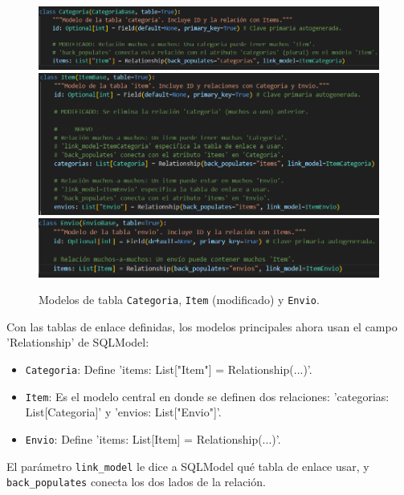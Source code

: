 \documentclass[12pt]{article}
\begin{document}
\begin{figure}[H]
    \centering
    \includegraphics[width=1\textwidth]{Imagenes/Prac4_2.1.png}
    \includegraphics[width=1\textwidth]{Imagenes/Prac4_2.2.png}
    \includegraphics[width=1\textwidth]{Imagenes/Prac4_2.3.png}
    \caption{Modelos de tabla \texttt{Categoria}, \texttt{Item} (modificado) y \texttt{Envio}.}
\end{figure}

Con las tablas de enlace definidas, los modelos principales ahora usan el campo 'Relationship' de SQLModel:
\begin{itemize}
    \item \texttt{Categoria}: Define 'items: List["Item"] = Relationship(...)'.
    \item \texttt{Item}: Es el modelo central en donde se definen dos relaciones: 'categorias: List[Categoria]' y 'envios: List["Envio"]'.
    \item \texttt{Envio}: Define 'items: List[Item] = Relationship(...)'.
\end{itemize}
El parámetro \texttt{link\_model} le dice a SQLModel qué tabla de enlace usar, y \texttt{back\_populates} conecta los dos lados de la relación.
\end{document}
